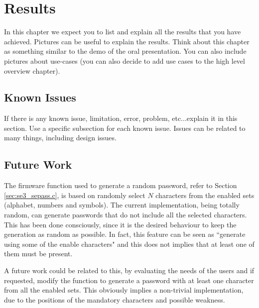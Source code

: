 \chapter{Results}
In this chapter we expect you to list and explain all the results that you have achieved. Pictures can be useful to explain the results. Think about this chapter as something similar to the demo of the oral presentation. You can also include pictures about use-cases (you can also decide to add use cases to the high level overview chapter).
\section{Known Issues}
If there is any known issue, limitation, error, problem, etc...explain it in this section. Use a specific subsection for each known issue. Issues can be related to many things, including design issues.
\section{Future Work}
\label{sec:future_work}

The firmware function used to generate a random password, refer to Section \ref{sec:se3_sepass.c}, is based on randomly select $N$ characters from the enabled sets (alphabet, numbers and symbols). The current implementation, being totally random, can generate passwords that do not include all the selected characters. This has been done consciously, since it is the desired behaviour to keep the generation as random as possible. In fact, this feature can be seen as ``generate using some of the enable characters" and this does not implies that at least one of them must be present.

A future work could be related to this, by evaluating the needs of the users and if requested, modify the function to generate a password with at least one character from all the enabled sets. This obviously implies a non-trivial implementation, due to the positions of the mandatory characters and possible weakness.